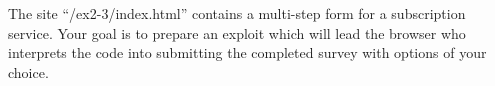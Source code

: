 \documentclass{./handout}
\begin{document}
\begin{comment}
\begin{subtask}
\paragraph{Token Synchronizer Pattern}
The implementation of the Token Synchronizer Pattern has been improved.
Find a way to still exploit the web page.

``Usually, the tokens should be some function (with a secret key - known only
to the server; e.g., MAC) of the cookie! not the cookie.

Than the flow is as follows: 1. Client sends the server request with a
cookie. 2. Server returns a web page with CSRF token(s) for different
purposes (e.g., forms or just a simple get requests via the URL). 3. The
client performs some action (via POST or GET) and sends request with the
token (in the request body or in the URL) and with the cookie. 4. The
server is stateless, but it can verify that the request was sent by the
same client by calculating the function (with the secret key that the
server knows) on the cookie (or on part of it), and comparing the output
with the token.

In the case of CSRF, the cookie is automatically appended to the request by
the browser, but the attacker (that probably even doesn't know the cookie)
cannot add the corresponding tokens.''
\end{comment}




\begin{subtask}
The site ``/ex2-3/index.html'' contains a multi-step form for a subscription 
service. Your goal is to prepare an exploit which will lead the browser who 
interprets the code into submitting the completed survey with options
of your choice.
\end{subtask}
\end{document}
